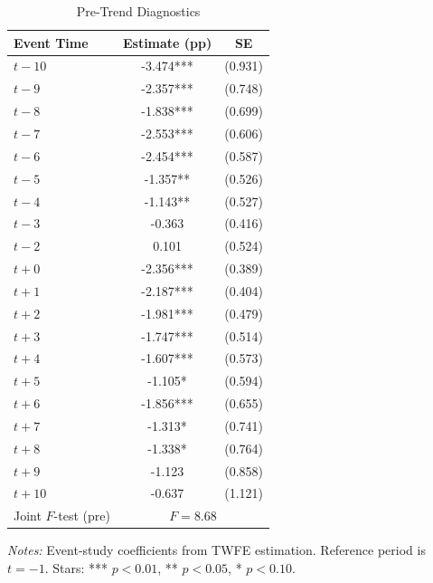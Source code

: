 \begin{table}[htbp]
\centering
\caption{Pre-Trend Diagnostics}
\label{tab:pretrend}
\begin{tabular}{lcc}
\toprule
Event Time & Estimate (pp) & SE \\
\midrule
$t -10$ & -3.474*** & (0.931) \\
$t -9$ & -2.357*** & (0.748) \\
$t -8$ & -1.838*** & (0.699) \\
$t -7$ & -2.553*** & (0.606) \\
$t -6$ & -2.454*** & (0.587) \\
$t -5$ & -1.357** & (0.526) \\
$t -4$ & -1.143** & (0.527) \\
$t -3$ & -0.363 & (0.416) \\
$t -2$ & 0.101 & (0.524) \\
$t +0$ & -2.356*** & (0.389) \\
$t +1$ & -2.187*** & (0.404) \\
$t +2$ & -1.981*** & (0.479) \\
$t +3$ & -1.747*** & (0.514) \\
$t +4$ & -1.607*** & (0.573) \\
$t +5$ & -1.105* & (0.594) \\
$t +6$ & -1.856*** & (0.655) \\
$t +7$ & -1.313* & (0.741) \\
$t +8$ & -1.338* & (0.764) \\
$t +9$ & -1.123 & (0.858) \\
$t +10$ & -0.637 & (1.121) \\
\midrule
Joint $F$-test (pre) & \multicolumn{2}{c}{$F = 8.68$} \\
\bottomrule
\end{tabular}
\begin{minipage}{0.8\textwidth}
\footnotesize
\emph{Notes:} Event-study coefficients from TWFE estimation. Reference period is $t = -1$. Stars: *** $p<0.01$, ** $p<0.05$, * $p<0.10$.
\end{minipage}
\end{table}
